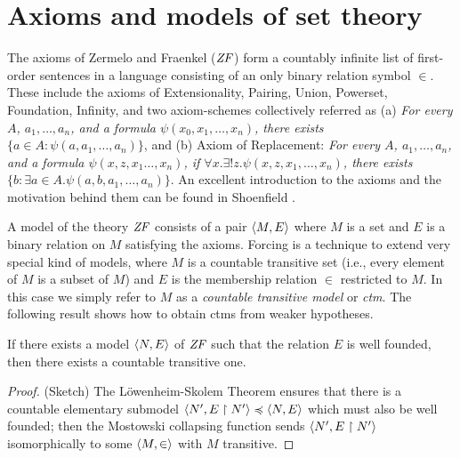 \section{Axioms and models of set theory}
\label{sec:axioms-models-set-theory}

The axioms of Zermelo and Fraenkel ($\mathit{ZF}$) form a
countably infinite list of first-order sentences in a language
consisting of an only binary relation symbol $\in$. These include the
axioms of Extensionality, Pairing, Union, Powerset, Foundation, Infinity, and two
axiom-schemes collectively referred as
(a) \emph{For every $A$, $a_1,\dots,a_n$,  and  a formula
  $\psi(x_0,x_1,\dots,x_n)$, there exists $\{a\in  A:
  \psi(a,a_1,\dots,a_n)\}$}, 
and (b) Axiom of Replacement: \emph{For every $A$, $a_1,\dots,a_n$,  and
  a formula   $\psi(x,z,x_1\dots,x_n)$, if 
  $\forall x.\exists!z.\psi(x,z,x_1,\dots,x_n)$,  there exists 
  $\{b : \exists a\in A. \psi(a,b,a_1,\dots,a_n)\}$}.
An excellent introduction to the axioms and the motivation behind them
can be found in Shoenfield \cite{MR3727410}. 

A model of the theory $\mathit{ZF}$ consists of a pair $\langle M,E\rangle$ where $M$
is a set and $E$ is a binary relation on $M$ satisfying the
axioms. Forcing is a technique 
to extend very special kind of models, where $M$ is a countable
transitive set (i.e., every element of $M$ is a subset of $M$) and
$E$ is the membership relation $\in$ restricted to $M$. In this case
we simply refer to $M$ as a \emph{countable transitive model} or
\emph{ctm}. The following result shows how to obtain ctms from weaker
hypotheses. 
%
\begin{lemma}\label{lem:wf-model-implies-ctm}
  If there exists  a
  model  $\langle N,E\rangle$  of $\mathit{ZF}$ such that the relation $E$ is well
  founded, then there exists a countable transitive one.
\end{lemma}
\begin{proof}
  (Sketch) The L\"owenheim-Skolem 
  Theorem ensures that there is a countable elementary submodel 
  $\langle N',E\upharpoonright N'\rangle\preccurlyeq  \langle N,E\rangle$ which must also be
  well founded; then the 
  Mostowski collapsing function \cite[Def.~I.9.31]{kunen2011set} sends $\langle
  N',E\upharpoonright N'\rangle$ 
  isomorphically to some $\langle M,\in\rangle$ with  $M$ transitive.
\end{proof}

